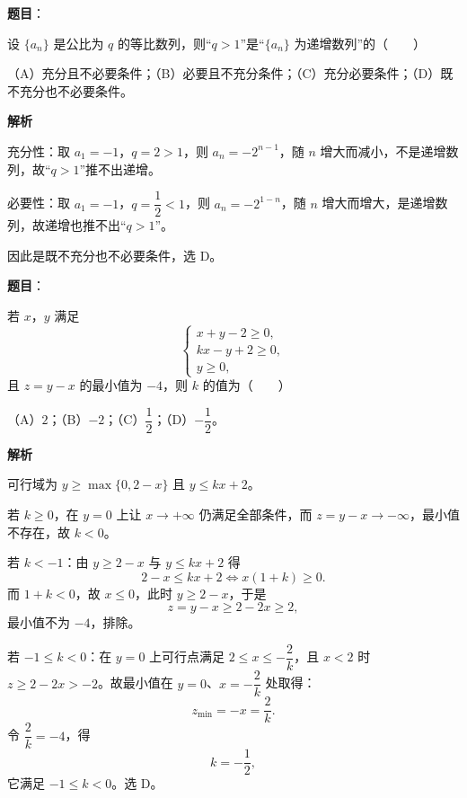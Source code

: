 \begin{answer}

\textbf{题目}：

设 $\{a_n\}$ 是公比为 $q$ 的等比数列，则“$q>1$”是“$\{a_n\}$ 为递增数列”的\mbox{（　　）}

（A）充分且不必要条件；（B）必要且不充分条件；（C）充分必要条件；（D）既不充分也不必要条件。

\textbf{解析}

充分性：取 $a_1=-1$，$q=2>1$，则 $a_n=-2^{n-1}$，随 $n$ 增大而减小，不是递增数列，故“$q>1$”推不出递增。

必要性：取 $a_1=-1$，$q=\dfrac12<1$，则 $a_n=-2^{1-n}$，随 $n$ 增大而增大，是递增数列，故递增也推不出“$q>1$”。

因此是既不充分也不必要条件，选 D。


\end{answer}
\begin{answer}

\textbf{题目}：

若 $x$，$y$ 满足
\nopagebreak[4]
\[\begin{cases}
x+y-2\geqslant 0,\\
kx-y+2\geqslant 0,\\
y\geqslant 0,
\end{cases}\]
且 $z=y-x$ 的最小值为 $-4$，则 $k$ 的值为\mbox{（　　）}

（A）$2$；（B）$-2$；（C）$\dfrac12$；（D）$-\dfrac12$。

\textbf{解析}

可行域为 $y\geqslant\max\{0,2-x\}$ 且 $y\leqslant kx+2$。

若 $k\geqslant0$，在 $y=0$ 上让 $x\to+\infty$ 仍满足全部条件，而 $z=y-x\to-\infty$，最小值不存在，故 $k<0$。

若 $k<-1$：由 $y\geqslant2-x$ 与 $y\leqslant kx+2$ 得
\nopagebreak[4]
\[2-x\leqslant kx+2\iff x(1+k)\geqslant0 .\]
而 $1+k<0$，故 $x\leqslant0$，此时 $y\geqslant2-x$，于是
\nopagebreak[4]
\[z=y-x\geqslant 2-2x\geqslant2,\]
最小值不为 $-4$，排除。

若 $-1\leqslant k<0$：在 $y=0$ 上可行点满足 $2\leqslant x\leqslant-\dfrac2k$，且 $x<2$ 时 $z\geqslant2-2x>-2$。故最小值在 $y=0$、$x=-\dfrac2k$ 处取得：
\nopagebreak[4]
\[z_{\min}=-x=\frac2k .\]
令 $\dfrac2k=-4$，得
\nopagebreak[4]
\[k=-\frac12,\]
它满足 $-1\leqslant k<0$。选 D。


\end{answer}
